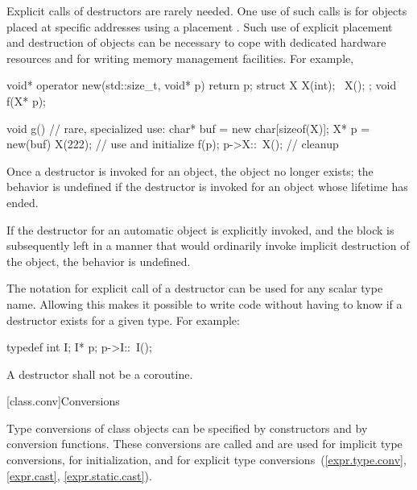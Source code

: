\pnum
\begin{note}
%
Explicit calls of destructors are rarely needed.
One use of such calls is for objects placed at specific
addresses using a placement
.
Such use of explicit placement and destruction of objects can be necessary
to cope with dedicated hardware resources and for writing memory management
facilities.
For example,
\begin{codeblock}
void* operator new(std::size_t, void* p) { return p; }
struct X {
  X(int);
  ~X();
};
void f(X* p);

void g() {                      // rare, specialized use:
  char* buf = new char[sizeof(X)];
  X* p = new(buf) X(222);       // use  and initialize
  f(p);
  p->X::~X();                   // cleanup
}
\end{codeblock}
\end{note}

\pnum
Once a destructor is invoked for an object, the object no longer exists;
the behavior is undefined if the destructor is invoked
for an object whose lifetime has ended.
\begin{example}
If the destructor for an automatic object is explicitly invoked,
and the block is subsequently left in a manner that would ordinarily
invoke implicit destruction of the object, the behavior is undefined.
\end{example}

\pnum
\begin{note}
%
The notation for explicit call of a destructor can be used for any scalar type
name.
Allowing this makes it possible to write code without having to know if a
destructor exists for a given type.
For example:
\begin{codeblock}
typedef int I;
I* p;
p->I::~I();
\end{codeblock}
\end{note}

\pnum
A destructor shall not be a coroutine.

[class.conv]{Conversions}

\pnum
{}%
%
%
%
Type conversions of class objects can be specified by constructors and
by conversion functions.
These conversions are called
and are used for implicit type conversions,
for initialization,
and for explicit type conversions~(\ref{expr.type.conv}, \ref{expr.cast},
\ref{expr.static.cast}).

